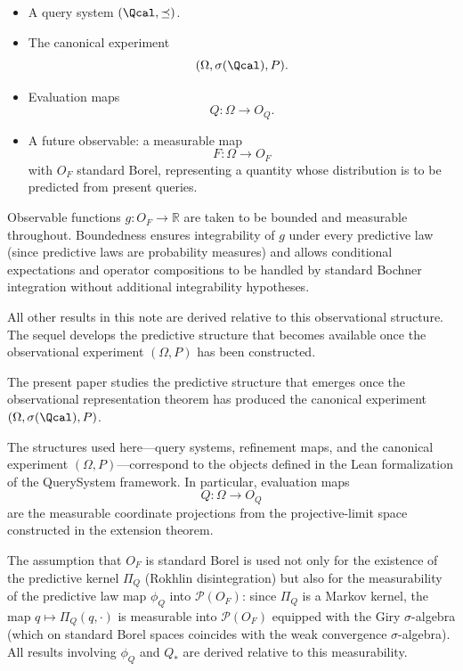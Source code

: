 \begin{itemize}
\item A query system $(\Qcal,\preceq)$.
\item The canonical experiment
\[
(\Omega,\sigma(\Qcal),P).
\]
\item Evaluation maps
\[
Q:\Omega\to O_Q.
\]
\item A future observable: a measurable map
\[
F:\Omega\to O_F
\]
with $O_F$ standard Borel, representing a quantity whose distribution
is to be predicted from present queries.
\end{itemize}

Observable functions $g:O_F\to\mathbb R$ are taken to be bounded and
measurable throughout.  Boundedness ensures integrability of $g$ under
every predictive law (since predictive laws are probability measures)
and allows conditional expectations and operator compositions to be
handled by standard Bochner integration without additional
integrability hypotheses.

All other results in this note are derived relative to this observational
structure.  The sequel develops the predictive structure that becomes
available once the observational experiment $(\Omega,P)$ has been
constructed.

\begin{remark}
The present paper studies the predictive structure that emerges once
the observational representation theorem has produced the canonical
experiment $(\Omega,\sigma(\Qcal),P)$.
\end{remark}

\begin{remark}[Formalization]
The structures used here---query systems, refinement maps, and the
canonical experiment $(\Omega,P)$---correspond to the objects defined in
the Lean formalization of the QuerySystem framework.  In particular,
evaluation maps
\[
Q:\Omega\to O_Q
\]
are the measurable coordinate projections from the projective-limit
space constructed in the extension theorem.

The assumption that $O_F$ is standard Borel is used not only for the
existence of the predictive kernel $\Pi_Q$ (Rokhlin disintegration)
but also for the measurability of the predictive law map $\phi_Q$ into
$\mathcal P(O_F)$: since $\Pi_Q$ is a Markov kernel, the map
$q\mapsto\Pi_Q(q,\cdot)$ is measurable into $\mathcal P(O_F)$ equipped
with the Giry $\sigma$-algebra (which on standard Borel spaces coincides
with the weak convergence $\sigma$-algebra).  All results involving
$\phi_Q$ and $Q_*$ are derived relative to this measurability.
\end{remark}

